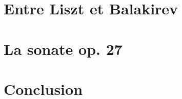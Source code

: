\documentclass[]{music}
\begin{document}




\newpage
\strut\thispagestyle{empty}
\newpage




\newpage
\tableofcontents
\newpage
\strut\thispagestyle{empty}
\newpage
\strut\thispagestyle{empty}
\newpage


\part*{Entre Liszt et Balakirev}




\part*{La sonate op. 27}




\part*{Conclusion}




\newpage
\strut\thispagestyle{empty}
\newpage





\end{document}
